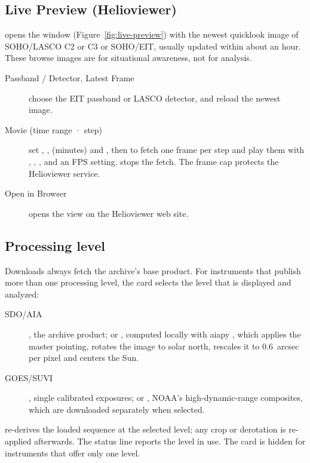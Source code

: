 \subsection{Live Preview (Helioviewer)}
\label{sec:live-preview}

 opens the 
window (Figure~\ref{fig:live-preview}) with the newest quicklook image of SOHO/LASCO C2 or C3
or SOHO/EIT, usually updated within about an hour. These browse images are for situational
awareness, not for analysis.


\begin{description}
  \item[Passband / Detector, Latest Frame] choose the EIT passband or LASCO detector, and
    reload the newest image.
  \item[Movie (time range · step)] set , , 
    (minutes) and , then  to fetch one frame per step and
    play them with , , ,  and an FPS setting.
     stops the fetch. The frame cap protects the Helioviewer service.
  \item[Open in Browser] opens the view on the Helioviewer web site.
\end{description}

\subsection{Processing level}
\label{sec:processing-level}

Downloads always fetch the archive's base product. For instruments that publish more than
one processing level, the  card selects the level that is displayed and
analyzed:
\begin{description}
  \item[SDO/AIA] , the archive product; or
    , computed locally with aiapy \parencite{barnes2020},
    which applies the master pointing, rotates the image to solar north, rescales it to
    0.6~arcsec per pixel and centers the Sun.
  \item[GOES/SUVI] , single calibrated exposures; or
    , NOAA's high-dynamic-range composites, which are
    downloaded separately when selected.
\end{description}
 re-derives the loaded sequence at the selected level; any crop or
derotation is re-applied afterwards. The status line reports the level in use. The card is
hidden for instruments that offer only one level.

